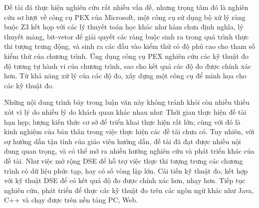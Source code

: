 Đề tài đã thực hiện nghiên cứu rất nhiều vấn đề, nhưng trọng tâm đó là nghiên cứu sơ lượt về công cụ PEX của Microsoft, một công cụ sử dụng bộ xử lý ràng buộc Z3 \cite{de2008z3} kết họp với các lý thuyết toán học khác như hàm chưa định nghĩa, lý thuyết mảng, bit-vetor \cite{kroening2016decision} để giải quyết các ràng buộc sinh ra trong quá trình thực thi tượng trưng động, và sinh ra các đầu vào kiểm thử có độ phủ cao cho tham số kiểm thử của chương trình. Ứng dụng công cụ PEX nghiên cứu các kỹ thuật đo độ tương tự hành vi của chương trình, sao cho kết quả các độ đo được chính xác hơn. Từ khả năng xử lý của các độ đo, xây dựng một công cụ để minh họa cho các kỹ thuật đo.

Những nội dung trình bày trong luận văn này không tránh khỏi còn nhiều thiếu xót vì lý do nhiều lý do khách quan khác nhau như: Thời gian thực hiện đề tài hạn hẹp; lượng kiến thức cơ sở để triển khai thực hiện rất lớn; cùng với đó là kinh nghiệm của bản thân trong việc thực hiện các đề tài chưa có. Tuy nhiên, với sự hướng dẫn tận tình của giáo viên hướng dẫn, đề tài đã đạt được nhiều nội dung quan trọng, và có thể mở ra nhiều hướng nghiên cứu và phát triển khác của đề tài. Như việc mở rộng DSE để hỗ trợ việc thực thi tượng trưng các chương trình có dữ liệu phức tạp, hay có số vòng lặp lớn. Cải tiến kỹ thuật đo, kết hợp với kỹ thuật DSE để có kết quả độ đo được chính xác hơn, nhạy hơn. Tiếp tục nghiên cứu, phát triển để thực các kỹ thuật đo trên các ngôn ngữ khác như Java, C++ và chạy được trên nền tảng PC, Web. 

